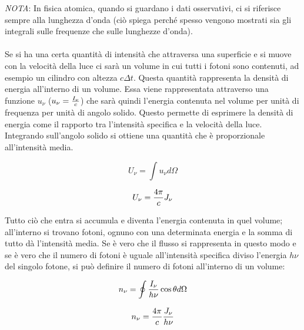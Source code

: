 \documentclass[a4paper,11pt]{article}
\begin{document}
\vspace{0.5 cm}

\textit{NOTA}: In fisica atomica, quando si guardano i dati osservativi, ci si riferisce sempre alla lunghezza d'onda (ciò spiega perché spesso vengono mostrati sia gli integrali sulle frequenze che sulle lunghezze d'onda).
\\ \\ Se si ha una certa quantità di intensità che attraversa una superficie e si muove con la velocità della luce ci sarà un volume in cui tutti i fotoni sono contenuti, ad esempio un cilindro con altezza $c\Delta t $. Questa quantità rappresenta la densità di energia all'interno di un volume. Essa viene rappresentata attraverso una funzione ${u_\nu}$ (${u_\nu} = {{I_\nu} \over {c}}$) che sarà quindi l'energia contenuta nel volume per unità di frequenza per unità di angolo solido. Questo permette di esprimere la densità di energia come il rapporto tra l'intensità specifica e la velocità della luce. Integrando sull'angolo solido si ottiene una quantità che è proporzionale all'intensità media. 

\begin{displaymath}
    {U_\nu} = \int {u_\nu} d\Omega 
\end{displaymath}

\begin{displaymath}
    {U_\nu} = {4\pi \over c} {J_\nu}
\end{displaymath}

Tutto ciò che entra si accumula e diventa l'energia contenuta in quel volume; all'interno si trovano fotoni, ognuno con una determinata energia e la somma di tutto dà l'intensità media. Se è vero che il flusso si rappresenta in questo modo e se è vero che il numero di fotoni è uguale all'intensità specifica diviso l'energia $h\nu$ del singolo fotone, si può definire il numero di fotoni all'interno di un volume:

\begin{displaymath}
    {n_\nu} = \oint {I_\nu \over h\nu} \cos{\theta} d\Omega
\end{displaymath}

\begin{displaymath}
    {n_\nu} = {4\pi \over c} {{J_\nu} \over h\nu}
\end{displaymath}
\end{document}
